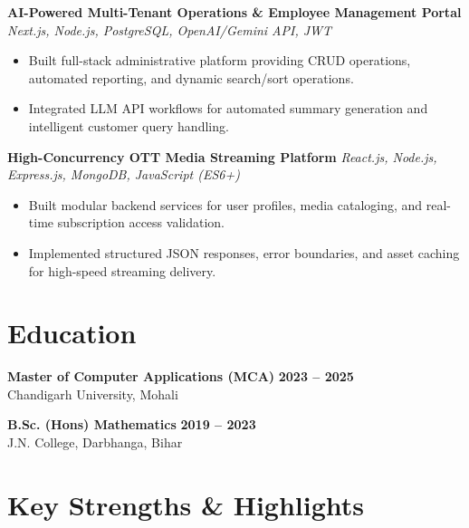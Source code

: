 \documentclass[a4paper,10pt]{article}
\begin{document}
\textbf{AI-Powered Multi-Tenant Operations \& Employee Management Portal}
\hfill
\textit{Next.js, Node.js, PostgreSQL, OpenAI/Gemini API, JWT}

\begin{itemize}

    \item Built full-stack administrative platform providing CRUD operations, automated reporting, and dynamic search/sort operations.

    \item Integrated LLM API workflows for automated summary generation and intelligent customer query handling.

\end{itemize}


\textbf{High-Concurrency OTT Media Streaming Platform}
\hfill
\textit{React.js, Node.js, Express.js, MongoDB, JavaScript (ES6+)}

\begin{itemize}

    \item Built modular backend services for user profiles, media cataloging, and real-time subscription access validation.

    \item Implemented structured JSON responses, error boundaries, and asset caching for high-speed streaming delivery.

\end{itemize}

\section*{Education}

\textbf{Master of Computer Applications (MCA)}
\hfill
\textbf{2023 -- 2025}
\\
Chandigarh University, Mohali

\vspace{3pt}

\textbf{B.Sc. (Hons) Mathematics}
\hfill
\textbf{2019 -- 2023}
\\
J.N. College, Darbhanga, Bihar

\section*{Key Strengths \& Highlights}
\end{document}
